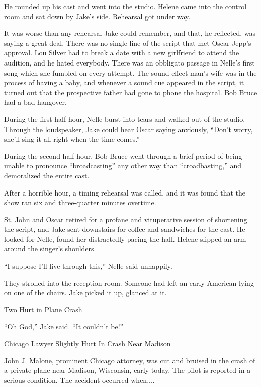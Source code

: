 \documentclass{novel}
\begin{document}
He rounded up his cast and went into the studio. Helene came into the control room and sat down by Jake’s side. Rehearsal got under way.

It was worse than any rehearsal Jake could remember, and that, he reflected, was saying a great deal. There was no single line of the script that met Oscar Jepp's approval. Lou Silver had to break a date with a new girlfriend to attend the audition, and he hated everybody. There was an obbligato passage in Nelle’s first song which she fumbled on every attempt. The sound-effect man’s wife was in the process of having a baby, and whenever a sound cue appeared in the script, it turned out that the prospective father had gone to phone the hospital. Bob Bruce had a bad hangover.

During the first half-hour, Nelle burst into tears and walked out of the studio. Through the loudspeaker, Jake could hear Oscar saying anxiously, “Don’t worry, she’ll sing it all right when the time comes.”

During the second half-hour, Bob Bruce went through a brief period of being unable to pronounce “broadcasting” any other way than “croadbasting,” and demoralized the entire cast.

After a horrible hour, a timing rehearsal was called, and it was found that the show ran six and three-quarter minutes overtime.

St. John and Oscar retired for a profane and vituperative session of shortening the script, and Jake sent downstairs for coffee and sandwiches for the cast. He looked for Nelle, found her distractedly pacing the hall. Helene slipped an arm around the singer’s shoulders.

“I suppose I'll live through this,” Nelle said unhappily.

They strolled into the reception room. Someone had left an early American lying on one of the chairs. Jake picked it up, glanced at it.

Two Hurt in Plane Crash

“Oh God,” Jake said. “It couldn’t be!”

Chicago Lawyer Slightly Hurt In Crash Near Madison

John J. Malone, prominent Chicago attorney, was cut and bruised in the crash of a private plane near Madison, Wisconsin, early today. The pilot is reported in a serious condition. The accident occurred when....

\begin{ChapterStart}
\vspace{3\nbs}
\end{ChapterStart}
\end{document}
